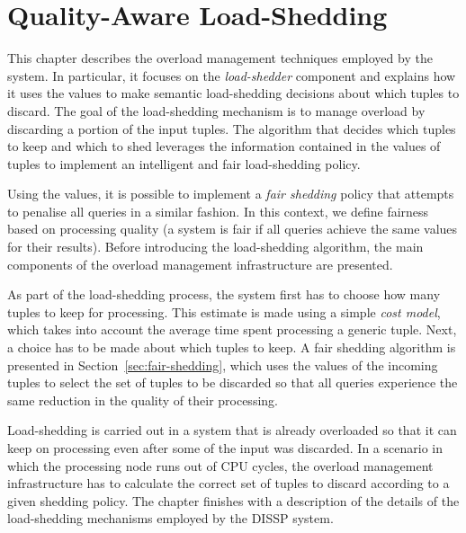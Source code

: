 \chapter{Quality-Aware Load-Shedding}
\label{ch:load_shedding}

This chapter describes the overload management techniques employed by the \sys
system. In particular, it focuses on the \emph{load-shedder} component and explains how it uses the \sic
values to make semantic load-shedding decisions about which tuples to discard. 
The goal of the \mbox{load-shedding} mechanism is to manage overload by discarding a portion of the input
tuples. The algorithm that decides which tuples to keep and which to shed leverages the information
contained in the \sic values of tuples to implement an intelligent and fair load-shedding policy.

Using the \sic values, it is possible to implement a \emph{fair shedding} policy that attempts to
penalise all queries in a similar fashion. In this context, we define fairness based on
processing quality (\ie a system is fair if all queries achieve the same \sic values for their results).
Before introducing the load-shedding algorithm, the main components of the overload management
infrastructure are presented.

As part of the load-shedding process, the system first has to choose how many tuples to keep for
processing.
This estimate is made using a simple \emph{cost model}, which takes into account the average time spent
processing a generic tuple. 
Next, a choice has to be made about which tuples to keep.
A fair shedding algorithm is presented in Section~\ref{sec:fair-shedding}, which uses the \sic
values of the incoming tuples to select the set of tuples to be discarded so that all queries experience
the same reduction in the quality of their processing.

\mbox{Load-shedding} is carried out in a system that is already overloaded so that it can keep on
processing even after some of the input was discarded. In a scenario in which the processing node runs
out of CPU cycles, the overload management infrastructure has to calculate the correct set of tuples to discard according to a given shedding policy. 
The chapter finishes with a description of the details of the \mbox{load-shedding} mechanisms
employed by the DISSP system.

